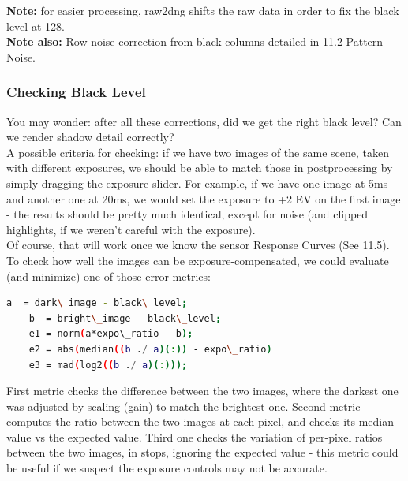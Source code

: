 \textbf{Note:} for easier processing, raw2dng shifts the raw data in order to fix the black level at 128.\\

\textbf{Note also:} Row noise correction from black columns detailed in 11.2 Pattern Noise.
 




\subsubsection{Checking Black Level}

You may wonder: after all these corrections, did we get the right black level? Can we render shadow detail correctly?\\

A possible criteria for checking: if we have two images of the same scene, taken with different exposures, we should be able to match those in postprocessing by simply dragging the exposure slider. For example, if we have one image at 5ms and another one at 20ms, we would set the exposure to +2 EV on the first image - the results should be pretty much identical, except for noise (and clipped highlights, if we weren't careful with the exposure). \\

Of course, that will work once we know the sensor Response Curves (See 11.5).\\

To check how well the images can be exposure-compensated, we could evaluate (and minimize) one of those error metrics: 

\begin{lstlisting}[language=bash,morekeywords=$,keywordstyle=\bfseries,frame=none,xleftmargin=.25in,belowskip=2em, aboveskip=2em]
    a  = dark\_image - black\_level;
    b  = bright\_image - black\_level;
    e1 = norm(a*expo\_ratio - b);
    e2 = abs(median((b ./ a)(:)) - expo\_ratio)
    e3 = mad(log2((b ./ a)(:)));
\end{lstlisting}

First metric checks the difference between the two images, where the darkest one was adjusted by scaling (gain) to match the brightest one. Second metric computes the ratio between the two images at each pixel, and checks its median value vs the expected value. Third one checks the variation of per-pixel ratios between the two images, in stops, ignoring the expected value - this metric could be useful if we suspect the exposure controls may not be accurate.\\

